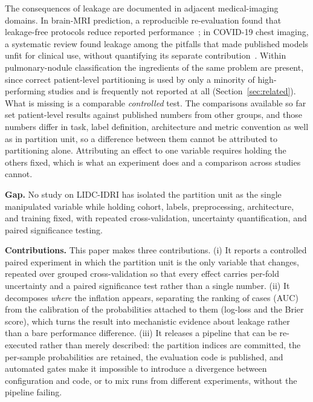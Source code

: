 \documentclass{ieeeaccess}
\newcommand{\vcite}[1]{\cite{#1}}
\begin{document}
The consequences of leakage are documented in adjacent medical-imaging domains. In brain-MRI
prediction, a reproducible re-evaluation found that leakage-free protocols reduce reported
performance~\vcite{wen2020}; in COVID-19 chest imaging, a systematic review found leakage among the
pitfalls that made published models unfit for clinical use, without quantifying its separate
contribution~\vcite{roberts2021}. Within
pulmonary-nodule classification the ingredients of the same problem are present, since correct
patient-level partitioning is used by only a minority of high-performing studies and is frequently
not reported at all (Section~\ref{sec:related}). What is missing is a comparable \emph{controlled}
test. The comparisons available so far set patient-level results against published numbers from
other groups, and those numbers differ in task, label definition, architecture and metric convention
as well as in partition unit, so a difference between them cannot be attributed to partitioning
alone. Attributing an effect to one variable requires holding the others fixed, which is what an
experiment does and a comparison across studies cannot.

\textbf{Gap.} No study on LIDC-IDRI has isolated the partition unit as the single manipulated
variable while holding cohort, labels, preprocessing, architecture, and training fixed, with
repeated cross-validation, uncertainty quantification, and paired significance testing.

\textbf{Contributions.} This paper makes three contributions. (i) It reports a controlled paired experiment in
which the partition unit is the only variable that changes, repeated over grouped cross-validation
so that every effect carries per-fold uncertainty and a paired significance test rather than a single
number. (ii) It decomposes \emph{where} the inflation appears, separating the ranking of cases (AUC)
from the calibration of the probabilities attached to them (log-loss and the Brier score), which
turns the result into mechanistic evidence about leakage rather than a bare performance difference.
(iii) It releases a pipeline that can be re-executed rather than merely described: the partition
indices are committed, the per-sample probabilities are retained, the evaluation code is published,
and automated gates make it impossible to introduce a divergence between configuration and code, or
to mix runs from different experiments, without the pipeline failing.
\end{document}
